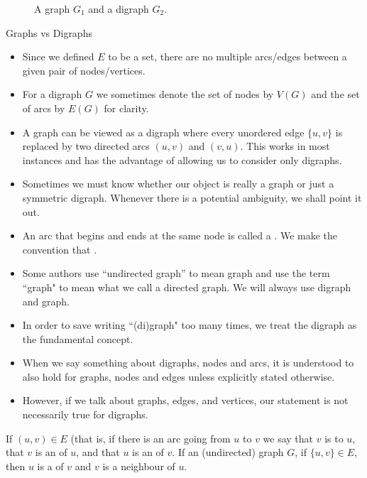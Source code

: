 \begin{figure}
\centerline{}
\caption{A graph $G_1$ and a digraph $G_2$.}
\label{fig:graphExample}
\end{figure}


\begin{note}
Graphs vs Digraphs
\begin{itemize}
  \item Since we defined $E$ to be a set, there are no multiple arcs/edges
  between a given pair of nodes/vertices.
  \item For a digraph $G$ we sometimes denote the set of nodes by $V(G)$
  and the set of arcs by $E(G)$ for clarity.
  \item A graph can be viewed as a digraph where every unordered edge $\{u, v\}$ 
  is replaced by two directed arcs $(u, v)$ and $(v, u)$.  
  This works in most instances and has the advantage of allowing us to consider only digraphs.
  \item Sometimes we must know whether our object is really a graph or just a symmetric digraph. Whenever there
  is a potential ambiguity, we shall point it out.
  \item  An arc that begins and ends at the same node is called a . 
  We make the convention that . 
  \item Some authors use ``undirected graph'' to mean graph and use the term ``graph" to mean what we call a directed graph. We will always use digraph and graph.
  \item In order to save writing ``(di)graph" too many times, we treat the digraph as the fundamental concept.
  \item When we say something about digraphs, nodes and arcs, it is understood to also hold for graphs, nodes and edges unless explicitly stated otherwise. 
  \item However, if we talk about graphs, edges, and vertices, our statement is not necessarily true for digraphs. 
\end{itemize}
\end{note}


\begin{Definition}\label{def:adjacent}  
If $(u, v)\in E$ (that is, if there is an arc going from $u$ to $v$ we say that $v$ is  
to $u$, that $v$ is an  of $u$, and that $u$ is an 
 of $v$.
If an (undirected) graph $G$, if $\{u, v\} \in E$, then $u$ is a  of $v$ and $v$ is a neighbour of $u$. 
\end{Definition}


